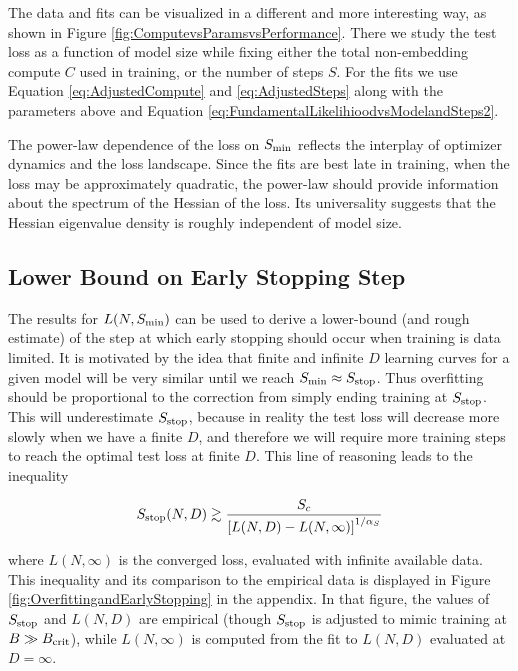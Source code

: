The data and fits can be visualized in a different and more interesting way, as shown in Figure \ref{fig:ComputevsParamsvsPerformance}.  There we study the test loss as a function of model size while fixing either the total non-embedding compute $C$ used in training, or the number of steps $S$.  For the fits we use Equation \eqref{eq:AdjustedCompute} and \eqref{eq:AdjustedSteps} along with the parameters above and Equation \eqref{eq:FundamentalLikelihioodvsModelandSteps2}.

The power-law dependence of the loss on $S_{\rm min}$ reflects the interplay of optimizer dynamics and the loss landscape.    Since the fits are best late in training, when the loss may be approximately quadratic, the power-law should provide information about the spectrum of the Hessian of the loss.  Its universality suggests that the Hessian eigenvalue density is roughly independent of model size.  

\subsection{Lower Bound on Early Stopping Step}
\label{sec:EarlyStop}

The results for $L(N,S_{\rm min})$ can be used to derive a lower-bound (and rough estimate) of the step at which early stopping should occur when training is data limited. It is motivated by the idea that finite and infinite $D$ learning curves for a given model will be very similar until we reach $S_{\rm min} \approx S_{\rm stop}$. Thus overfitting should be proportional to the correction from simply ending  training at $S_{\rm stop}$.  This will underestimate $S_{\rm stop}$, because in reality the test loss will decrease more slowly when we have a finite $D$, and therefore we will require more training steps to reach the optimal test loss at finite $D$. This line of reasoning leads to the inequality

\begin{equation}
\label{eq:EarlyStopInequality}
S_{\rm stop}(N,D)  \gtrsim \frac{S_c}{\left[ L(N,D) - L(N, \infty) \right]^{1 / \alpha_S}}
\end{equation}

where $L(N, \infty)$ is the converged loss, evaluated with infinite available data.  This inequality and its comparison to the empirical data is displayed in Figure \ref{fig:OverfittingandEarlyStopping} in the appendix.  In that figure, the values of $S_{\rm stop}$ and $L(N,D)$ are empirical (though $S_{\rm stop}$ is adjusted to mimic training at $B \gg B_{\rm crit}$), while $L(N, \infty)$ is computed from the fit to $L(N,D)$ evaluated at $D=\infty$.

